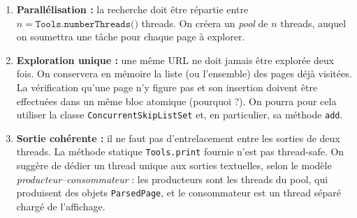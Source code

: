 \begin{enumerate}
  \item \textbf{Parallélisation :}
  la recherche doit être répartie entre $n = \texttt{Tools.numberThreads()}$ threads.
  On créera un \emph{pool} de $n$ threads, auquel on soumettra une tâche pour chaque page à explorer.

  \item \textbf{Exploration unique :}
  une même URL ne doit jamais être explorée deux fois.
  On conservera en mémoire la liste (ou l'ensemble) des pages déjà visitées.
  La vérification qu'une page n'y figure pas et son insertion doivent être effectuées dans un même bloc atomique
  (pourquoi ?).  
  On pourra pour cela utiliser la classe \texttt{ConcurrentSkipListSet} et, en particulier, sa méthode \texttt{add}.

  \item \textbf{Sortie cohérente :}
  il ne faut pas d'entrelacement entre les sorties de deux threads.
  La méthode statique \texttt{Tools.print} fournie n'est pas thread-safe.
  On suggère de dédier un thread unique aux sorties textuelles, selon le modèle \emph{producteur–consommateur} :
  les producteurs sont les threads du pool, qui produisent des objets \texttt{ParsedPage},
  et le consommateur est un thread séparé chargé de l'affichage.
\end{enumerate}

\endgroup
\endinput
